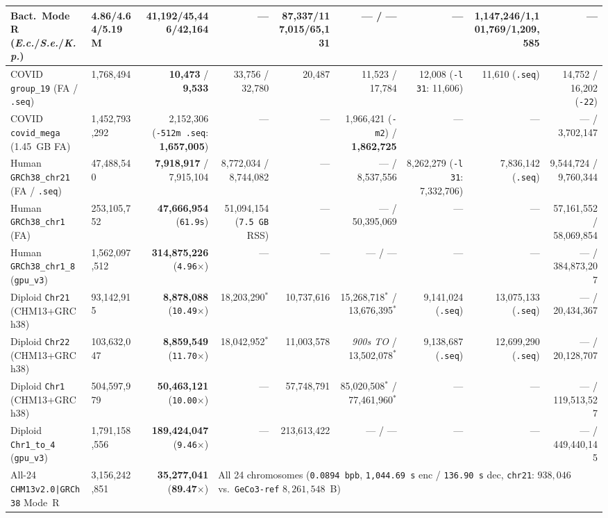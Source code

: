 \documentclass[10pt]{article}
\theoremstyle{definition}
\begin{document}
\begin{table}[h!]
{\begin{tabular}{llrrrrrrr}
Bact.\ Mode~R (\textit{E.c.}/\textit{S.e.}/\textit{K.p.}) & 4.86/4.64/5.19M & \textbf{41,192}/\textbf{45,446}/\textbf{42,164} & --- & 87,337/117,015/65,131 & --- / --- & --- & 1,147,246/1,101,769/1,209,585 & --- \\
\midrule
COVID \texttt{group\_19} (FA / \texttt{.seq}) & 1,768,494 & \textbf{10,473} / \textbf{9,533} & 33,756 / 32,780 & 20,487 & 11,523 / 17,784 & 12,008 (\texttt{-l 31}: 11,606) & 11,610 (\texttt{.seq}) & 14,752 / 16,202 (\texttt{-22}) \\
COVID \texttt{covid\_mega} (1.45~GB FA) & 1,452,793,292 & 2,152,306 (\texttt{-512m .seq}: \textbf{1,657,005}) & --- & --- & 1,966,421 (\texttt{-m2}) / \textbf{1,862,725} & --- & --- & --- / 3,702,147 \\
\midrule
Human \texttt{GRCh38\_chr21} (FA / \texttt{.seq}) & 47,488,540 & \textbf{7,918,917} / 7,915,104 & 8,772,034 / 8,744,082 & --- & --- / 8,537,556 & 8,262,279 (\texttt{-l 31}: 7,332,706) & 7,836,142 (\texttt{.seq}) & 9,544,724 / 9,760,344 \\
Human \texttt{GRCh38\_chr1} (FA) & 253,105,752 & \textbf{47,666,954} (\texttt{61.9s}) & 51,094,154 (\texttt{7.5 GB} RSS) & --- & --- / 50,395,069 & --- & --- & 57,161,552 / 58,069,854 \\
Human \texttt{GRCh38\_chr1\_8} (\texttt{gpu\_v3}) & 1,562,097,512 & \textbf{314,875,226} (\texttt{4.96$\times$}) & --- & --- & --- / --- & --- & --- & --- / 384,873,207 \\
\midrule
Diploid \texttt{Chr21} (CHM13+GRCh38) & 93,142,915 & \textbf{8,878,088} (\texttt{10.49$\times$}) & 18,203,290$^*$ & 10,737,616 & 15,268,718$^*$ / 13,676,395$^*$ & 9,141,024 (\texttt{.seq}) & 13,075,133 (\texttt{.seq}) & --- / 20,434,367 \\
Diploid \texttt{Chr22} (CHM13+GRCh38) & 103,632,047 & \textbf{8,859,549} (\texttt{11.70$\times$}) & 18,042,952$^*$ & 11,003,578 & \textit{900s TO} / 13,502,078$^*$ & 9,138,687 (\texttt{.seq}) & 12,699,290 (\texttt{.seq}) & --- / 20,128,707 \\
Diploid \texttt{Chr1} (CHM13+GRCh38) & 504,597,979 & \textbf{50,463,121} (\texttt{10.00$\times$}) & --- & 57,748,791 & 85,020,508$^*$ / 77,461,960$^*$ & --- & --- & --- / 119,513,527 \\
Diploid \texttt{Chr1\_to\_4} (\texttt{gpu\_v3}) & 1,791,158,556 & \textbf{189,424,047} (\texttt{9.46$\times$}) & --- & 213,613,422 & --- / --- & --- & --- & --- / 449,440,145 \\
\midrule
All-24 \texttt{CHM13v2.0|GRCh38} Mode~R & 3,156,242,851 & \textbf{35,277,041} (\textbf{89.47$\times$}) & \multicolumn{6}{l}{All 24 chromosomes (\texttt{0.0894 bpb}, \texttt{1,044.69 s} enc / \texttt{136.90 s} dec, \texttt{chr21}: $938,046$ vs.\ \texttt{GeCo3-ref} $8,261,548$~B)} \\
\bottomrule
\end{tabular}%
}
\end{table}
\end{document}
